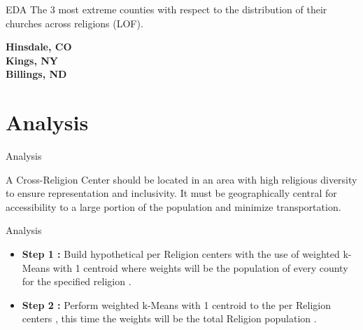 \documentclass[12pt]{beamer}
\begin{document}
\begin{frame}{EDA}
The 3 most extreme counties with respect to the distribution of their churches across religions (LOF).



 \textbf{Hinsdale, CO}     \\
 \textbf{Kings, NY}     \\
 \textbf{Billings, ND}      \\









\end{frame}






\section{Analysis}

\begin{frame}{Analysis  }

A Cross-Religion Center should be located in an area with high religious diversity to ensure representation and inclusivity. It must be geographically central for accessibility to a large portion of the population and minimize transportation.












\end{frame}


\begin{frame}{Analysis  }



\begin{itemize}
\item \textbf{Step 1 :} Build hypothetical per Religion centers with the use of weighted k-Means with 1 centroid where weights will be the population of every county for the specified religion .
\item \textbf{Step 2 :} Perform weighted  k-Means with 1 centroid to the per Religion centers , this time the weights will be the total Religion population .



\end{itemize}










\end{frame}
\end{document}
